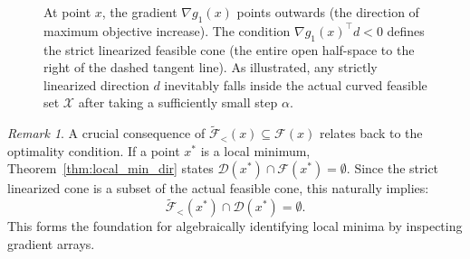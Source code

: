 \documentclass[11pt]{article}
\theoremstyle{definition}
\theoremstyle{plain}
\theoremstyle{remark}
\newtheorem{remark}{Remark}
\begin{document}
\begin{figure}[H]
    \centering
    \caption{At point $x$, the gradient $\nabla g_1(x)$ points outwards (the direction of maximum objective increase). The condition $\nabla g_1(x)^\top d < 0$ defines the strict linearized feasible cone (the entire open half-space to the right of the dashed tangent line). As illustrated, any strictly linearized direction $d$ inevitably falls inside the actual curved feasible set $\mathcal{X}$ after taking a sufficiently small step $\alpha$.}
    \label{fig:feasible_cone}
\end{figure}

\begin{remark}
  A crucial consequence of $\widetilde{\mathcal{F}}_{<}(x) \subseteq \mathcal{F}(x)$ relates back to the optimality condition. If a point $x^*$ is a local minimum, Theorem~\ref{thm:local_min_dir} states $\mathcal{D}(x^*) \cap \mathcal{F}(x^*) = \emptyset$. Since the strict linearized cone is a subset of the actual feasible cone, this naturally implies:
  \[
    \widetilde{\mathcal{F}}_{<}(x^*) \cap \mathcal{D}(x^*) = \emptyset.
  \]
  This forms the foundation for algebraically identifying local minima by inspecting gradient arrays.
\end{remark}
\end{document}
